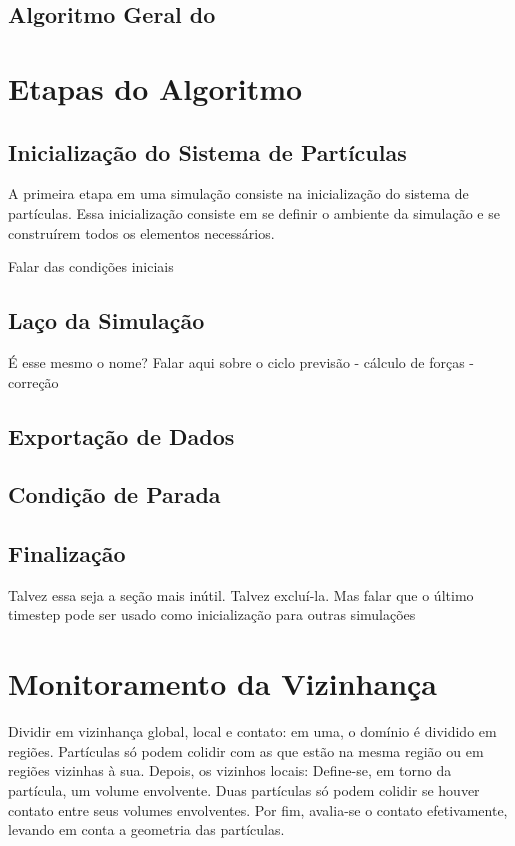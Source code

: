 \subsection{Algoritmo Geral do \DEM{}} \label{sec:dem_algorithm}

\section{Etapas do Algoritmo}
\subsection{Inicialização do Sistema de Partículas}

A primeira etapa em uma simulação \DEM{} consiste na inicialização do sistema de partículas. Essa inicialização consiste em se definir o ambiente da simulação e se construírem todos os elementos necessários.

\alert{Falar das condições iniciais}

\subsection{Laço da Simulação}
\alert{É esse mesmo o nome? Falar aqui sobre o ciclo previsão - cálculo de forças - correção}

\subsection{Exportação de Dados}

\subsection{Condição de Parada}

\subsection{Finalização}\alert{Talvez essa seja a seção mais inútil. Talvez excluí-la. Mas falar que o último timestep pode ser usado como inicialização para outras simulações}

\section{Monitoramento da Vizinhança} \label{sec:neighborhood}
\alert{Dividir em vizinhança global, local e contato: em uma, o domínio é dividido em regiões. Partículas só podem colidir com as que estão na mesma região ou em regiões vizinhas à sua. Depois, os vizinhos locais: Define-se, em torno da partícula, um volume envolvente. Duas partículas só podem colidir se houver contato entre seus volumes envolventes. Por fim, avalia-se o contato efetivamente, levando em conta a geometria das partículas.}

